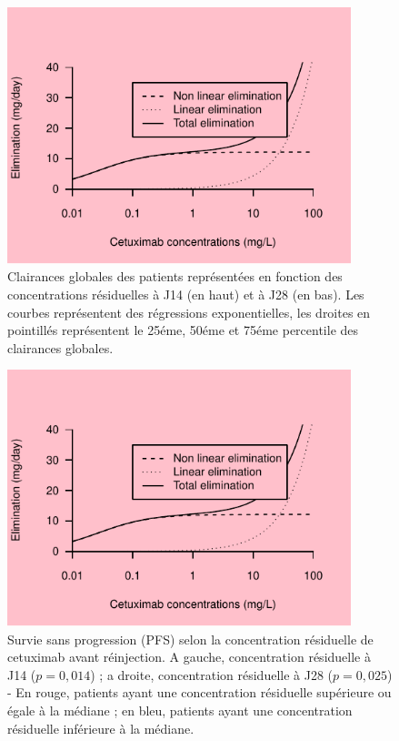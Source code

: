 \begin{figure}[htbp]
	\centering
		\includegraphics[width=10cm]{images/essai001.pdf}
	\caption{Clairances globales des patients représentées en fonction des concentrations résiduelles à J14 (en haut) et à J28 (en bas). Les courbes représentent des régressions exponentielles, les droites en pointillés représentent le 25éme, 50éme et 75éme percentile des clairances globales.}
	\label{fig:30}
\end{figure}
\begin{figure}[htbp]
	\centering
		\includegraphics[width=10cm]{images/essai001.pdf}
	\caption{Survie sans progression (PFS) selon la concentration résiduelle de cetuximab avant réinjection. A gauche, concentration résiduelle à J14 ($p = 0,014$) ; a droite, concentration résiduelle à J28 ($p = 0,025$) - En rouge, patients ayant une concentration résiduelle supérieure ou égale à la médiane ; en bleu, patients ayant une concentration résiduelle inférieure à la médiane.}
	\label{fig:31}
\end{figure}
